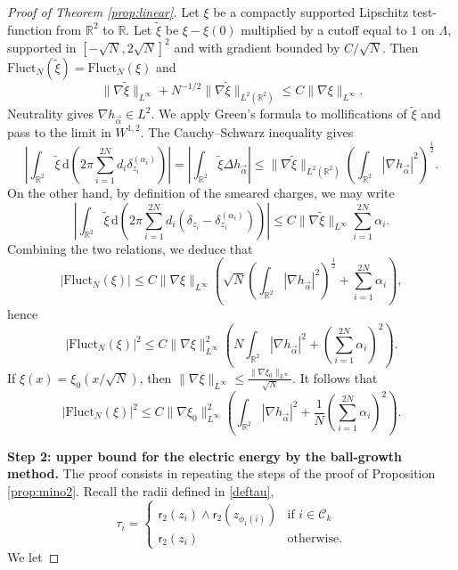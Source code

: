 \documentclass[a4paper,10pt,leqno]{amsart}
\numberwithin{equation}{section}
\newcommand{\R}{\mathbb{R}}
\newcommand{\dd}{\mathrm{d}}
\def\hal{\frac{1}{2}}
\def\nab{\nabla}
\def\Fluct{\mathrm{Fluct}}
\def\rr{\mathsf{r}}
\begin{document}
\begin{proof}[Proof of Theorem \ref{prop:linear}]
  Let $\xi$ be a compactly supported Lipschitz test-function from $\R^2 $ to $\R$.
  Let $\tilde\xi$ be $\xi-\xi(0)$ multiplied by a cutoff equal to $1$ on $\Lambda$, supported in $[-\sqrt N,2\sqrt N]^2$ and with gradient bounded by $C/\sqrt N$. Then $\Fluct_N(\tilde\xi)=\Fluct_N(\xi)$ and
  \[
    \|\nab\tilde\xi\|_{L^\infty}+N^{-1/2}\|\nab\tilde\xi\|_{L^2(\R^2)}\le C\|\nab\xi\|_{L^\infty}.
  \]
  Neutrality gives $\nab h_{\vec\alpha}\in L^2$. We apply Green's formula to mollifications of $\tilde\xi$ and pass to the limit in $W^{1,2}$. The Cauchy--Schwarz inequality gives
  \begin{equation*}
    \left|\int_{\R^2}\tilde\xi \, \dd\left( 2\pi \sum_{i=1}^{2N} d_i \delta_{z_i}^{(\alpha_i)}\right)\right|=
    \left|\int_{\R^2} \tilde\xi \Delta h_{\vec{\alpha}}\right|\le \|\nab\tilde\xi\|_{L^2(\R^2)}\left( \int_{\R^2}|\nab h_{\vec{\alpha}}|^2\right)^\hal.\end{equation*}
  On the other hand, by definition of the smeared charges, we may write
  \begin{equation*}
    \left|\int_{\R^2} \tilde\xi \, \dd\left( 2\pi \sum_{i=1}^{2N} d_i (\delta_{z_i}- \delta_{z_i}^{(\alpha_i)})\right)
    \right|\le C \|\nab\tilde\xi\|_{L^\infty} \sum_{i=1}^{2N} \alpha_i.\end{equation*}
  Combining the two relations, we deduce that
  \begin{equation*}
    \left|\Fluct_N(\xi)\right|\le C \|\nab \xi\|_{L^\infty} \left(\sqrt N\left( \int_{\R^2}|\nab h_{\vec{\alpha}}|^2\right)^\hal+ \sum_{i=1}^{2N} \alpha_i\right),
  \end{equation*}
  hence
  \begin{equation*}
    \left|\Fluct_N(\xi)\right|^2 \le C \|\nab \xi\|_{L^\infty}^2 \left(N \int_{\R^2}|\nab h_{\vec{\alpha}}|^2+ \left(\sum_{i=1}^{2N} \alpha_i\right)^2\right).\end{equation*}
  If $\xi(x)= \xi_0( x/\sqrt{N})$, then $\|\nab \xi\|_{L^\infty} \le \frac{\|\nab \xi_0\|_{L^\infty}}{\sqrt N}$. It follows that
  \begin{equation*}
    \left|\Fluct_N(\xi)\right|^2 \le C \|\nab \xi_0\|_{L^\infty}^2 \left(\int_{\R^2}|\nab h_{\vec{\alpha}}|^2+\frac{1}{N}\left(\sum_{i=1}^{2N} \alpha_i\right)^2\right).\end{equation*}
  \smallskip

  \noindent
  \textbf{Step 2: upper bound for the electric energy by the ball-growth method.}
  The proof consists in repeating the steps of the proof of Proposition \ref{prop:mino2}. Recall the radii defined in \eqref{deftau},
  \begin{equation*}
    \tau_i= \begin{cases}
      \rr_2(z_{i})\wedge \rr_2(z_{\phi_1(i) }) & \text{if $i\in \mathcal C_k$}\\
      \rr_2(z_i) & \text{otherwise}.\end{cases}
  \end{equation*}
  We let


\end{proof}
\end{document}
